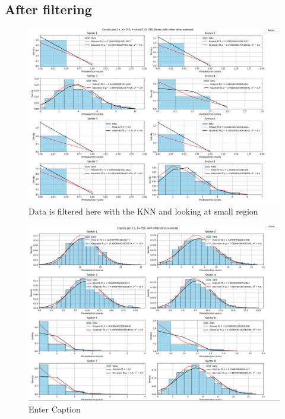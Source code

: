\subsection{After filtering}

\begin{figure}
    \centering
    \includegraphics[width=1\linewidth]{images/poisson_stats/after_filtering_region_1000s.png}
    \caption{Data is filtered here with the KNN and looking at small region}
\end{figure}

\begin{figure}
    \centering
    \includegraphics[width=1\linewidth]{images/poisson_stats/filtered_allY_singleX.png}
    \caption{Enter Caption}
\end{figure}



